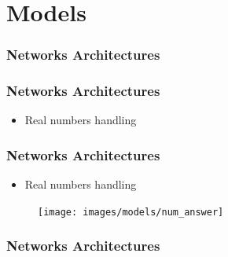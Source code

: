 \documentclass[18pt, xcolor=table]{beamer}
\begin{document}
\section{Models}

\begin{frame}[t]
  \frametitle{Networks Architectures}
\end{frame}

\begin{frame}[t]
  \frametitle{Networks Architectures}
  \begin{itemize}
  \item Real numbers handling
  \end{itemize}
\end{frame}

\begin{frame}[t]
  \frametitle{Networks Architectures}
  \begin{itemize}
  \item Real numbers handling
  \end{itemize}
  \begin{center}
    \begin{figure}[htb]
      \texttt{[image: images/models/num\_answer]}
    \end{figure}
  \end{center}
\end{frame}

\begin{frame}[t]
  \frametitle{Networks Architectures}
\end{frame}
\end{document}
